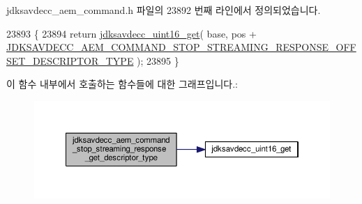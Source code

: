 jdksavdecc\+\_\+aem\+\_\+command.\+h 파일의 23892 번째 라인에서 정의되었습니다.


\begin{DoxyCode}
23893 \{
23894     \textcolor{keywordflow}{return} \hyperlink{group__endian_ga3fbbbc20be954aa61e039872965b0dc9}{jdksavdecc\_uint16\_get}( base, pos + 
      \hyperlink{group__command__stop__streaming__response_ga2362d1ec1d35a7924cb6168317281084}{JDKSAVDECC\_AEM\_COMMAND\_STOP\_STREAMING\_RESPONSE\_OFFSET\_DESCRIPTOR\_TYPE}
       );
23895 \}
\end{DoxyCode}


이 함수 내부에서 호출하는 함수들에 대한 그래프입니다.\+:
\nopagebreak
\begin{figure}[H]
\begin{center}
\leavevmode
\includegraphics[width=350pt]{group__command__stop__streaming__response_ga34b89a4a83a1b2095386c25db82b29cd_cgraph}
\end{center}
\end{figure}




